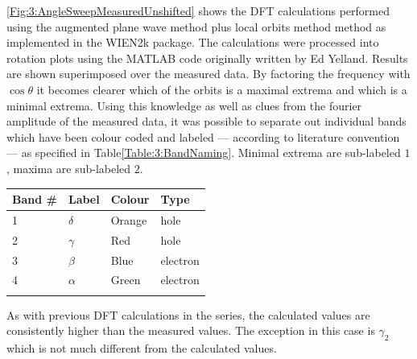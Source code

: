 \Fig\ref{Fig:3:AngleSweepMeasuredUnshifted} shows the DFT calculations performed using the augmented plane wave method plus local orbits method method as implemented in the WIEN2k package\cite{Blaha2001}. The calculations were processed into rotation plots using the MATLAB code originally written by Ed Yelland. Results are shown superimposed over the measured data. By factoring the frequency with $\cos{\theta}$ it becomes clearer which of the orbits is a maximal extrema and which is a minimal extrema. Using this knowledge as well as clues from the fourier amplitude of the measured data, it was possible to separate out individual bands which have been colour coded and labeled --- according to literature convention --- as specified in Table\ref{Table:3:BandNaming}. Minimal extrema are sub-labeled $1$, maxima are sub-labeled $2$.
\begin{center}
    \begin{tabular}[!h]{llll}
\toprule
Band #  & Label & Colour    & Type \\
\midrule
1   & $\delta$  & Orange    & hole \\
2   & $\gamma$  & Red   & hole \\
3   & $\beta$   & Blue  & electron \\
4   & $\alpha$  & Green & electron \\
\bottomrule
    \label{Table:3:BandNaming}
    \end{tabular}
\end{center}
As with previous DFT calculations in the \BaFeAsP series, the calculated values are consistently higher than the measured values. The exception in this case is $\gamma_2$ which is not much different from the calculated values.
